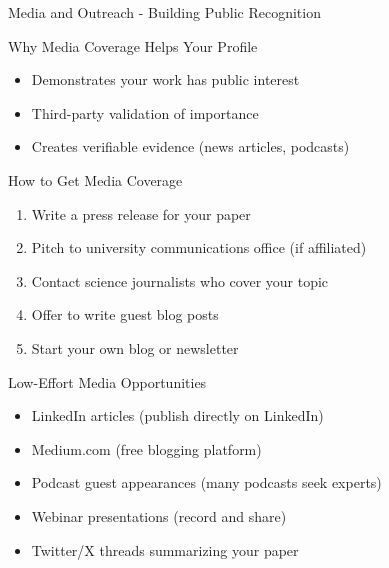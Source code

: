 \documentclass[11pt]{beamer}
\begin{document}
				\begin{frame}{Media and Outreach - Building Public Recognition}
					\scriptsize
					\begin{block}{Why Media Coverage Helps Your Profile}
						\begin{itemize}
							\item Demonstrates your work has public interest
							\item Third-party validation of importance
							\item Creates verifiable evidence (news articles, podcasts)
						\end{itemize}
					\end{block}
					\begin{block}{How to Get Media Coverage}
						\begin{enumerate}
							\item Write a press release for your paper
							\item Pitch to university communications office (if affiliated)
							\item Contact science journalists who cover your topic
							\item Offer to write guest blog posts
							\item Start your own blog or newsletter
						\end{enumerate}
					\end{block}
					\begin{block}{Low-Effort Media Opportunities}
						\begin{itemize}
							\item LinkedIn articles (publish directly on LinkedIn)
							\item Medium.com (free blogging platform)
							\item Podcast guest appearances (many podcasts seek experts)
							\item Webinar presentations (record and share)
							\item Twitter/X threads summarizing your paper
						\end{itemize}
					\end{block}
				\end{frame}
				
\end{document}
